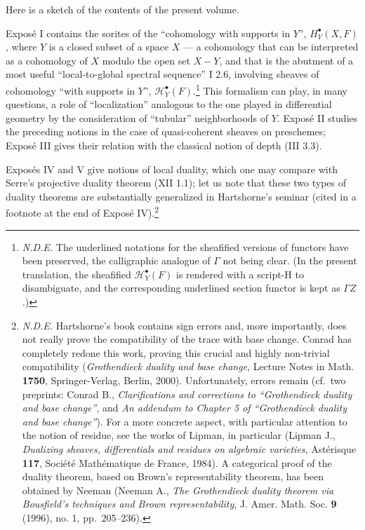 \documentclass[
]{article}
\begin{document}
Here is a sketch of the contents of the present volume.

Exposé I contains the sorites of the ``cohomology with supports in
\(Y\)'', \(H^{\bullet}_{Y}(X, F)\), where \(Y\) is a closed subset of a
space \(X\) --- a cohomology that can be interpreted as a cohomology of
\(X\) modulo the open set \(X - Y\), and that is the abutment of a most
useful ``local-to-global spectral sequence'' I 2.6, involving sheaves of
cohomology ``with supports in \(Y\)'',
\(\mathcal{H}^{\bullet}_{Y}(F)\).\footnote{\emph{N.D.E.} The underlined
  notations for the sheafified versions of functors have been preserved,
  the calligraphic analogue of \(\Gamma\) not being clear. (In the
  present translation, the sheafified \(\mathcal{H}^{\bullet}_{Y}(F)\)
  is rendered with a script-H to disambiguate, and the corresponding
  underlined section functor is kept as \(\Gamma Z\).)} This formalism
can play, in many questions, a role of ``localization'' analogous to the
one played in differential geometry by the consideration of ``tubular''
neighborhoods of \(Y\). Exposé II studies the preceding notions in the
case of quasi-coherent sheaves on preschemes; Exposé III gives their
relation with the classical notion of depth (III 3.3).

Exposés IV and V give notions of local duality, which one may compare
with Serre's projective duality theorem (XII 1.1); let us note that
these two types of duality theorems are substantially generalized in
Hartshorne's seminar (cited in a footnote at the end of Exposé
IV).\footnote{\emph{N.D.E.} Hartshorne's book contains sign errors and,
  more importantly, does not really prove the compatibility of the trace
  with base change. Conrad has completely redone this work, proving this
  crucial and highly non-trivial compatibility (\emph{Grothendieck
  duality and base change}, Lecture Notes in Math. \textbf{1750},
  Springer-Verlag, Berlin, 2000). Unfortunately, errors remain (cf.~two
  preprints: Conrad B., \emph{Clarifications and corrections to
  ``Grothendieck duality and base change''}, and \emph{An addendum to
  Chapter 5 of ``Grothendieck duality and base change''}). For a more
  concrete aspect, with particular attention to the notion of residue,
  see the works of Lipman, in particular (Lipman J., \emph{Dualizing
  sheaves, differentials and residues on algebraic varieties},
  Astérisque \textbf{117}, Société Mathématique de France, 1984). A
  categorical proof of the duality theorem, based on Brown's
  representability theorem, has been obtained by Neeman (Neeman A.,
  \emph{The Grothendieck duality theorem via Bousfield's techniques and
  Brown representability}, J. Amer. Math. Soc. \textbf{9} (1996), no. 1,
  pp.~205--236).}
\end{document}
